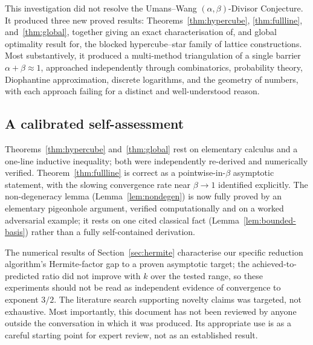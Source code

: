 \documentclass[12pt]{article}
\theoremstyle{remark}
\begin{document}
This investigation did not resolve the Umans--Wang $(\alpha,\beta)$-Divisor
Conjecture.  It produced three new proved results: Theorems~\ref{thm:hypercube},
\ref{thm:fullline}, and~\ref{thm:global}, together giving an exact
characterisation of, and global optimality result for, the blocked
hypercube--star family of lattice constructions.  Most substantively, it
produced a multi-method triangulation of a single barrier $\alpha + \beta \approx
1$, approached independently through combinatorics, probability theory,
Diophantine approximation, discrete logarithms, and the geometry of numbers,
with each approach failing for a distinct and well-understood reason.

\subsection{A calibrated self-assessment}
\label{sec:selfassess}

Theorems~\ref{thm:hypercube} and~\ref{thm:global} rest on elementary calculus
and a one-line inductive inequality; both were independently re-derived and
numerically verified.  Theorem~\ref{thm:fullline} is correct as a
pointwise-in-$\beta$ asymptotic statement, with the slowing convergence rate
near $\beta \to 1$ identified explicitly.  The non-degeneracy lemma
(Lemma~\ref{lem:nondegen}) is now fully proved by an elementary pigeonhole
argument, verified computationally and on a worked adversarial example; it rests
on one cited classical fact (Lemma~\ref{lem:bounded-basis}) rather than a fully
self-contained derivation.

The numerical results of Section~\ref{sec:hermite} characterise our specific
reduction algorithm's Hermite-factor gap to a proven asymptotic target; the
achieved-to-predicted ratio did not improve with $k$ over the tested range, so
these experiments should not be read as independent evidence of convergence to
exponent $3/2$.  The literature search supporting novelty claims was targeted,
not exhaustive.  Most importantly, this document has not been reviewed by anyone
outside the conversation in which it was produced.  Its appropriate use is as a
careful starting point for expert review, not as an established result.
\end{document}
